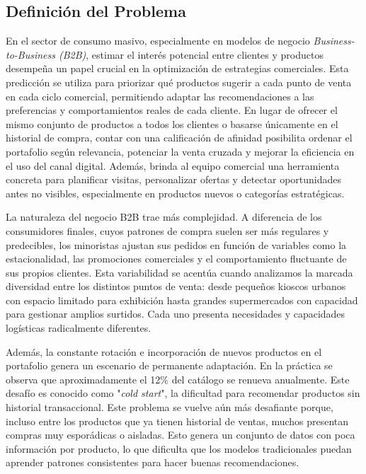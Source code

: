 \documentclass[
11pt, %
]{charter}
\begin{document}
\subsection{Definición del Problema}

En el sector de consumo masivo, especialmente en modelos de negocio \textit{Business-to-Business (B2B)}, estimar el interés potencial entre clientes y productos desempeña un papel crucial en la optimización de estrategias comerciales.  Esta predicción se utiliza para priorizar qué productos sugerir a cada punto de venta en cada ciclo comercial, permitiendo adaptar las recomendaciones a las preferencias y comportamientos reales de cada cliente. En lugar de ofrecer el mismo conjunto de productos a todos los clientes o basarse únicamente en el historial de compra, contar con una calificación de afinidad posibilita ordenar el portafolio según relevancia, potenciar la venta cruzada y mejorar la eficiencia en el uso del canal digital. Además, brinda al equipo comercial una herramienta concreta para planificar visitas, personalizar ofertas y detectar oportunidades antes no visibles, especialmente en productos nuevos o categorías estratégicas.

La naturaleza del negocio B2B trae más complejidad. A diferencia de los consumidores finales, cuyos patrones de compra suelen ser más regulares y predecibles, los minoristas ajustan sus pedidos en función de variables como la estacionalidad, las promociones comerciales y el comportamiento fluctuante de sus propios clientes. Esta variabilidad se acentúa cuando analizamos la marcada diversidad entre los distintos puntos de venta: desde pequeños kioscos urbanos con espacio limitado para exhibición hasta grandes supermercados con capacidad para gestionar amplios surtidos. Cada uno presenta necesidades y capacidades logísticas radicalmente diferentes.

Además, la constante rotación e incorporación de nuevos productos en el portafolio genera un escenario de permanente adaptación. En la práctica se observa que aproximadamente el 12\% del catálogo se renueva anualmente. Este desafío es conocido como "\textit{cold start}", la dificultad para recomendar productos sin historial transaccional. Este problema se vuelve aún más desafiante porque, incluso entre los productos que ya tienen historial de ventas, muchos presentan compras muy esporádicas o aisladas. Esto genera un conjunto de datos con poca información por producto, lo que dificulta que los modelos tradicionales puedan aprender patrones consistentes para hacer buenas recomendaciones.
\end{document}

